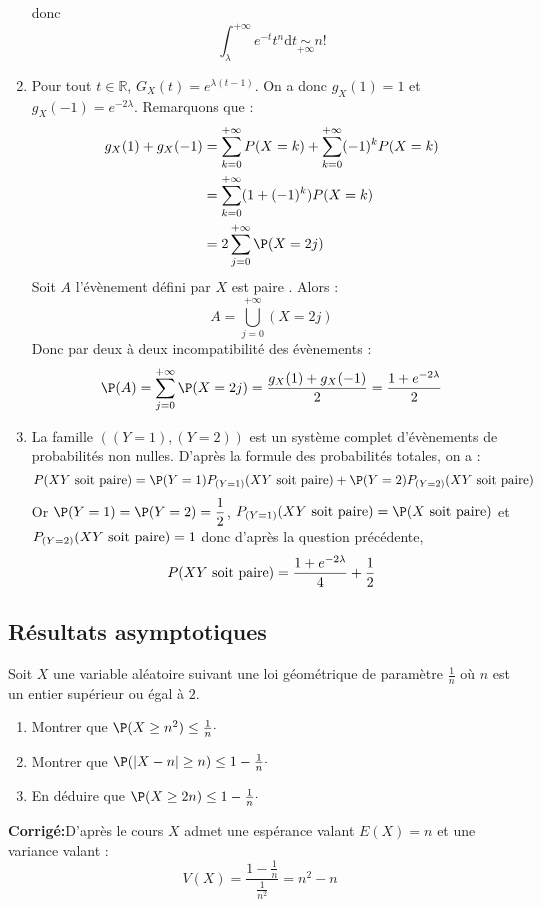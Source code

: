 \documentclass[a4paper,twoside,french,11pt]{VcCours}
\newcommand{\dt}{\text{d}t}
\newcommand{\corr}{\textbf{Corrigé:}}
\begin{document}
\begin{enumerate}
donc 
$$  \int_{\lambda}^{+ \infty} e^{-t} t^n \dt \underset{+ \infty}{\sim} n! $$
\item Pour tout $t \in \mathbb{R}$, $G_X(t) = e^{\lambda (t-1)}$. On a donc $g_X(1)=1$ et $g_X(-1)=e^{-2 \lambda}$. Remarquons que :
\begin{align*}
g_X(1) + g_X(-1) & = \sum_{k=0}^{+ \infty} P(X=k)  + \sum_{k=0}^{+ \infty} (-1)^k P(X=k)  \\
& = \sum_{k=0}^{+ \infty} (1+(-1)^k) P(X=k)  \\
& = 2 \sum_{j=0}^{+ \infty} \P(X=2j)
\end{align*}
Soit $A$ l'évènement défini par \og $X$ est paire \fg. Alors :
$$ A = \bigcup_{j=0}^{+ \infty} (X=2j)$$
Donc par deux à deux incompatibilité des évènements :
$$ \P(A) = \sum_{j=0}^{+ \infty} \P(X=2j) = \dfrac{g_X(1) +g_X(-1)}{2} = \dfrac{1+e^{-2\lambda}}{2}$$
\item La famille $((Y=1), (Y=2))$ est un système complet d'évènements de probabilités non nulles. D'après la formule des probabilités totales, on a :
$$ P(XY \hbox{ soit paire}) = \P(Y=1)P_{(Y=1)}(XY \hbox{ soit paire}) + \P(Y=2)P_{(Y=2)}(XY \hbox{ soit paire})$$
Or $\P(Y=1)= \P(Y=2) = \dfrac{1}{2}$, $P_{(Y=1)}(XY \hbox{ soit paire}) = \P(X \hbox{ soit paire})$ et $P_{(Y=2)}(XY \hbox{ soit paire}) = 1$ donc d'après la question précédente,
$$ P(XY \hbox{ soit paire}) = \dfrac{1+e^{-2\lambda}}{4} + \dfrac{1}{2}$$

\end{enumerate}


\subsection{Résultats asymptotiques}


\begin{Exercice}{} Soit $X$ une variable aléatoire suivant une loi géométrique de paramètre $\tfrac{1}{n}$ où $n$ est un entier supérieur ou égal à $2$.

\begin{enumerate}
\item Montrer que $\P(X \geq n^2) \leq \tfrac{1}{n}\cdot$
\item Montrer que $\P(\vert X-n \vert  \geq n ) \leq 1 - \tfrac{1}{n} \cdot$
\item En déduire que $\P(X \geq 2n) \leq 1 - \tfrac{1}{n} \cdot$
\end{enumerate}
\end{Exercice}

\corr D'après le cours $X$ admet une espérance valant $E(X)=n$ et une variance valant :
$$ V(X) = \dfrac{1- \tfrac{1}{n}}{\tfrac{1}{n^2}} = n^2-n$$
\end{document}
